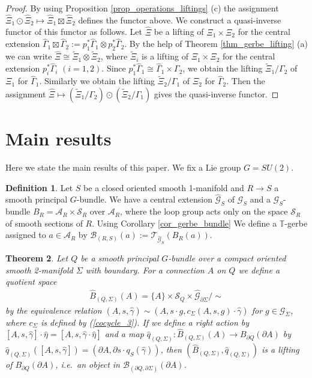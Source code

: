 \documentclass[a4paper,a4paper]{article}
\newtheorem{thm}{Theorem}[section]
\theoremstyle{definition}
\newtheorem{dfn}[thm]{Definition}
\theoremstyle{remark}
\newcommand{\T}{\mathbb{T}}
\newcommand{\A}{\mathcal{A}}
\newcommand{\B}{\mathcal{B}}
\newcommand{\G}{\mathcal{G}}
\newcommand{\sT}{\mathcal{T}}
\newcommand{\hq}{\widehat{q}}
\renewcommand{\S}{\mathcal{S}}
\def\h#1{ \widehat{#1} }
\begin{document}
\begin{proof}
By using Proposition \ref{prop_operations_liftings} (c) the assignment $\h{\Xi}_1 \odot \h{\Xi}_2 \mapsto \h{\Xi}_1 \boxtimes \h{\Xi}_2$ defines the functor above. We construct a quasi-inverse functor of this functor as follows. Let $\h{\Xi}$ be a lifting of $\Xi_1 \times \Xi_2$ for the central extension $\h{\Gamma}_1 \boxtimes \h{\Gamma}_2 := p_1^*\h{\Gamma}_1 \otimes p_2^*\h{\Gamma}_2$. By the help of Theorem \ref{thm_gerbe_lifting} (a) we can write $\h{\Xi} \cong \tilde{\Xi}_1 \otimes \tilde{\Xi}_2$, where $\tilde{\Xi}_i$ is a lifting of $\Xi_1 \times \Xi_2$ for the central extension $p_i^*\h{\Gamma}_i$ $(i = 1, 2)$. Since $p_1^*\h{\Gamma}_1 \cong \h{\Gamma}_1 \times \Gamma_2$, we obtain the lifting $\tilde{\Xi}_1 / \Gamma_2$  of $\Xi_1$ for $\h{\Gamma}_1$. Similarly we obtain the lifting $\tilde{\Xi}_2 / \Gamma_1$  of $\Xi_2$ for $\h{\Gamma}_2$. Then the assignment $\h{\Xi} \mapsto (\tilde{\Xi}_1 / \Gamma_2) \odot (\tilde{\Xi}_2 / \Gamma_1)$ gives the quasi-inverse functor.
\end{proof}



\section{Main results}
\label{la_results}

Here we state the main results of this paper. We fix a Lie group $G = SU(2)$.

\begin{dfn}
Let $S$ be a closed oriented smooth 1-manifold and $R \to S$ a smooth principal $G$-bundle. We have a central extension $\h{\G}_S$ of $\G_S$ and a $\G_S$-bundle $B_R = \A_R \times \S_R$ over $\A_R$, where the loop group acts only on the space $\S_R$ of smooth sections of $R$. Using Corollary \ref{cor_gerbe_bundle} We define a $\T$-gerbe assigned to $a \in \A_R$ by ${\B}_{(R, S)}(a) := \sT_{\h{\G}_S}(B_R(a))$.
\end{dfn}

\begin{thm}
Let $Q$ be a smooth principal $G$-bundle over a compact oriented smooth 2-manifold $\Sigma$ with boundary. For a connection $A$ on $Q$ we define a quotient space 
\begin{eqnarray}
\h{B}_{(Q, \Sigma)}(A) = 
\{A\} \times \S_Q \times \h{\G}_{\partial \Sigma} / \sim
\end{eqnarray} 
by the equivalence relation $(A, s, \h{\gamma}) \sim (A, s \cdot g, c_\Sigma(A,s,g) \cdot \h{\gamma})$ for $g \in \G_\Sigma$, where $c_\Sigma$ is defined by (\ref{cocycle_3}). If we define a right action by $[A, s,\h{\gamma}] \cdot \h{\eta} = [A, s,\h{\gamma} \cdot \h{\eta}]$ and a map $\hq_{(Q, \Sigma)} : \h{B}_{(Q, \Sigma)}(A)  \to  B_{\partial Q}(\partial A)$ by $\hq_{(Q, \Sigma)}([A, s, \h{\gamma}]) = (\partial A, \partial s \cdot q_S(\h{\gamma}))$, then $(\h{B}_{(Q,\Sigma)}, \hq_{(Q, \Sigma)})$ is a lifting of $B_{\partial Q}(\partial A)$, i.e.\ an object in $\B_{(\partial Q, \partial \Sigma)}(\partial A)$.
\end{thm}
\end{document}
